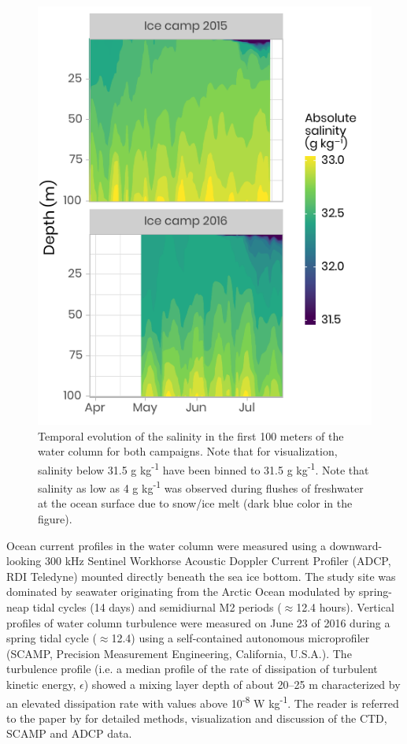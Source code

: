 \documentclass[essd, manuscript]{copernicus}
\begin{document}
\begin{figure}[H]
	\centering
	\includegraphics[scale = 1]{../../../../graphs/fig03.pdf}
	\caption{Temporal evolution of the salinity in the first 100 meters of the water column for both campaigns. Note that for visualization, salinity below 31.5 g kg\textsuperscript{-1} have been binned to 31.5 g kg\textsuperscript{-1}. Note that salinity as low as 4 g kg\textsuperscript{-1} was observed during flushes of freshwater at the ocean surface due to snow/ice melt (dark blue color in the figure).}
\end{figure}

Ocean current profiles in the water column were measured using a downward-looking 300 kHz Sentinel Workhorse Acoustic Doppler Current Profiler (ADCP, RDI Teledyne) mounted directly beneath the sea ice bottom. The study site was dominated by seawater originating from the Arctic Ocean modulated by spring-neap tidal cycles (14 days) and semidiurnal M2 periods ($\approx$12.4 hours). Vertical profiles of water column turbulence were measured on June 23 of 2016 during a spring tidal cycle ($\approx$12.4) using a self-contained autonomous microprofiler (SCAMP, Precision Measurement Engineering, California, U.S.A.). The turbulence profile (i.e. a median profile of the rate of dissipation of turbulent kinetic energy, $\epsilon$) showed a mixing layer depth of about 20–25 m characterized by an elevated dissipation rate with values above 10\textsuperscript{-8} W kg\textsuperscript{-1}. The reader is referred to the paper by \citet{Oziel2019} for detailed methods, visualization and discussion of the CTD, SCAMP and ADCP data. 
\end{document}
